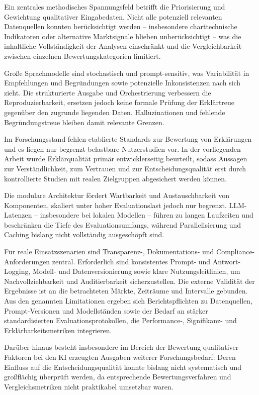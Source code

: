    Ein zentrales methodisches Spannungsfeld betrifft die Priorisierung und Gewichtung qualitativer Eingabedaten.
    Nicht alle potenziell relevanten Datenquellen konnten berücksichtigt werden -- insbesondere charttechnische Indikatoren oder alternative Marktsignale blieben unberücksichtigt -- was die inhaltliche Vollständigkeit der Analysen einschränkt und die Vergleichbarkeit zwischen einzelnen Bewertungskategorien limitiert.

    Große Sprachmodelle sind stochastisch und prompt-sensitiv, was Variabilität in Empfehlungen und Begründungen sowie potenzielle Inkonsistenzen nach sich zieht.
    Die strukturierte Ausgabe und Orchestrierung verbessern die Reproduzierbarkeit, ersetzen jedoch keine formale Prüfung der Erklärtreue gegenüber den zugrunde liegenden Daten.
    Halluzinationen und fehlende Begründungstreue bleiben damit relevante Grenzen.

    Im Forschungsstand fehlen etablierte Standards zur Bewertung von Erklärungen und es liegen nur begrenzt belastbare Nutzerstudien vor.
    In der vorliegenden Arbeit wurde Erklärqualität primär entwicklerseitig beurteilt, sodass Aussagen zur Verständlichkeit, zum Vertrauen und zur Entscheidungsqualität erst durch kontrollierte Studien mit realen Zielgruppen abgesichert werden können.

    Die modulare Architektur fördert Wartbarkeit und Austauschbarkeit von Komponenten, skaliert unter hoher Evaluationslast jedoch nur begrenzt.
    \acs{LLM}-Latenzen -- insbesondere bei lokalen Modellen -- führen zu langen Laufzeiten und beschränken die Tiefe des Evaluationsumfangs, während Parallelisierung und Caching bislang nicht vollständig ausgeschöpft sind.

    Für reale Einsatzszenarien sind Transparenz-, Dokumentations- und Compliance-Anforderungen zentral.
    Erforderlich sind konsistentes Prompt- und Antwort-Logging, Modell- und Datenversionierung sowie klare Nutzungsleitlinien, um Nachvollziehbarkeit und Auditierbarkeit sicherzustellen.
    Die externe Validität der Ergebnisse ist an die betrachteten Märkte, Zeiträume und Intervalle gebunden.
    Aus den genannten Limitationen ergeben sich Berichtspflichten zu Datenquellen, Prompt-Versionen und Modellständen sowie der Bedarf an stärker standardisierten Evaluationsprotokollen, die Performance-, Signifikanz- und Erklärbarkeitsmetriken integrieren.

    Darüber hinaus besteht insbesondere im Bereich der Bewertung qualitativer Faktoren bei den KI erzeugten Ausgaben weiterer Forschungsbedarf:
    Deren Einfluss auf die Entscheidungsqualität konnte bislang nicht systematisch und großflächig überprüft werden, da entsprechende Bewertungsverfahren und Vergleichsmetriken nicht praktikabel umsetzbar waren.

